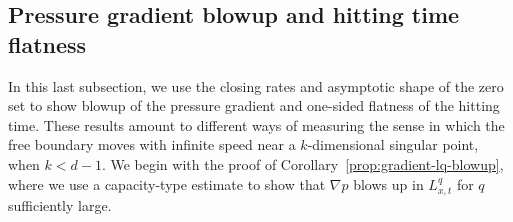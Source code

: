 \documentclass[11pt]{amsart}
\numberwithin{equation}{section}
\numberwithin{figure}{section}
\theoremstyle{plain}
\theoremstyle{definition}
\theoremstyle{remark}
\theoremstyle{plain}
\begin{document}
\subsection{Pressure gradient blowup and hitting time flatness}
\label{subsec:pressure-gradient-hitting-time-flatness}

In this last subsection, we use the closing rates and asymptotic shape of the zero set to show blowup of the pressure gradient and one-sided flatness of the hitting time. These results amount to different ways of measuring the sense in which the free boundary moves with infinite speed near a $k$-dimensional singular point, when $k < d-1$. We begin with the proof of Corollary~\ref{prop:gradient-lq-blowup}, where we use a capacity-type estimate to show that $\nabla p$ blows up in $L^q_{x,t}$ for $q$ sufficiently large.
\end{document}
